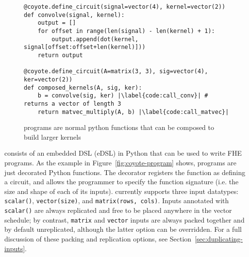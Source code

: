   
    

\begin{figure}
    \begin{verbatim}
@coyote.define_circuit(signal=vector(4), kernel=vector(2))
def convolve(signal, kernel):
    output = []
    for offset in range(len(signal) - len(kernel) + 1):
        output.append(dot(kernel, signal[offset:offset+len(kernel)]))
    return output
    
@coyote.define_circuit(A=matrix(3, 3), sig=vector(4), ker=vector(2))
def composed_kernels(A, sig, ker):
    b = convolve(sig, ker) |\label{code:call_conv}| # returns a vector of length 3
    return matvec_multiply(A, b) |\label{code:call_matvec}|
    \end{verbatim}
    \caption{\system programs are normal python functions that can be composed to build larger kernels}\label{fig:coyote-programs-compose}
\end{figure}

\system consists of an embedded DSL (eDSL) in Python that can be used to write FHE programs.
As the example in Figure~\ref{fig:coyote-program} shows, \system programs are just decorated Python functions.
The decorator registers the function as defining a \system circuit, and allows the programmer to specify the function signature (i.e. the size and shape of each of its inputs).
\system currently supports three input datatypes: \texttt{scalar()}, \texttt{vector(size)}, and \texttt{matrix(rows, cols)}.
Inputs annotated with \texttt{scalar()} are always replicated and free to be placed anywhere in the vector schedule; by contrast, \texttt{matrix} and \texttt{vector} inputs are always packed together and by default unreplicated, although the latter option can be overridden.
For a full discussion of these packing and replication options, see Section~\ref{sec:duplicating-inputs}. 

